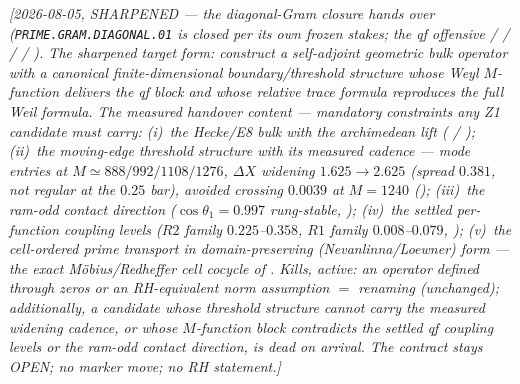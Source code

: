\emph{[2026-08-05, SHARPENED --- the diagonal-Gram closure hands
over (\texttt{PRIME.GRAM.DIAGONAL.01} is closed per its own frozen
stakes; the qf offensive  /
 /
 /
 /
).  The sharpened target form:
construct a self-adjoint geometric \emph{bulk} operator with a
canonical finite-dimensional boundary/threshold structure whose
Weyl $M$-function delivers the qf block and whose relative trace
formula reproduces the full Weil formula.  The \emph{measured
handover content} --- mandatory constraints any Z1 candidate must
carry: (i)~the Hecke/E8 bulk with the archimedean lift
( /
); (ii)~the moving-edge
threshold structure with its measured cadence --- mode entries at
$M\simeq888/992/1108/1276$, $\Delta X$ widening
$1.625\to2.625$ (spread $0.381$, not regular at the $0.25$ bar),
avoided crossing $0.0039$ at $M=1240$
(); (iii)~the ram-odd
contact direction ($\cos\theta_1=0.997$ rung-stable,
); (iv)~the settled
per-function coupling levels ($R2$ family $0.225$--$0.358$, $R1$
family $0.008$--$0.079$,
); (v)~the cell-ordered prime
transport in domain-preserving (Nevanlinna/Loewner) form ---
the exact M\"obius/Redheffer cell cocycle of
.  \emph{Kills, active:} an
operator defined through zeros or an RH-equivalent norm assumption
$=$ renaming (unchanged); additionally, a candidate whose
threshold structure cannot carry the measured widening cadence, or
whose $M$-function block contradicts the settled qf coupling
levels or the ram-odd contact direction, is dead on arrival.  The
contract stays OPEN; no marker move; no RH statement.]}
